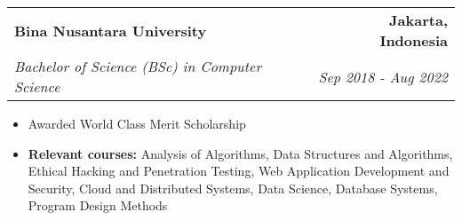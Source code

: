 
\noindent
\begin{tabularx}{\textwidth}{Xr}
    \textbf{Bina Nusantara University} & \textbf{Jakarta, Indonesia} \\
    \textit{Bachelor of Science (BSc) in Computer Science} & \textit{Sep 2018 - Aug 2022} \\
\end{tabularx}

\vspace{.5em}

\begin{itemize}[left=0em, noitemsep, nolistsep]
  \item Awarded World Class Merit Scholarship
  \item \textbf{Relevant courses:} Analysis of Algorithms, Data Structures and Algorithms, Ethical Hacking and Penetration Testing, Web Application Development and Security, Cloud and Distributed Systems, Data Science, Database Systems, Program Design Methods
\end{itemize}

\vspace{1em} %
